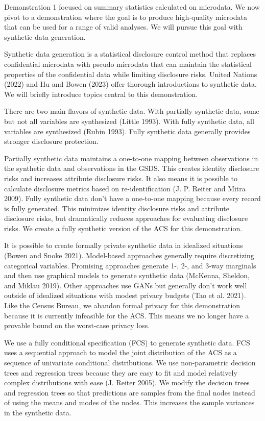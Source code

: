 \documentclass[
]{urban-formatting}
\begin{document}
Demonstration 1 focused on summary statistics calculated on microdata.
We now pivot to a demonstration where the goal is to produce
high-quality microdata that can be used for a range of valid analyses.
We will pursue this goal with synthetic data generation.

Synthetic data generation is a statistical disclosure control method
that replaces confidential microdata with pseudo microdata that can
maintain the statistical properties of the confidential data while
limiting disclosure risks. United Nations (2022) and Hu and Bowen (2023)
offer thorough introductions to synthetic data. We will briefly
introduce topics central to this demonstration.

There are two main flavors of synthetic data. With partially synthetic
data, some but not all variables are synthesized (Little 1993). With
fully synthetic data, all variables are synthesized (Rubin 1993). Fully
synthetic data generally provides stronger disclosure protection.

Partially synthetic data maintains a one-to-one mapping between
observations in the synthetic data and observations in the GSDS. This
creates identity disclosure risks and increases attribute disclosure
risks. It also means it is possible to calculate disclosure metrics
based on re-identification (J. P. Reiter and Mitra 2009). Fully
synthetic data don't have a one-to-one mapping because every record is
fully generated. This minimizes identity disclosure risks and attribute
disclosure risks, but dramatically reduces approaches for evaluating
disclosure risks. We create a fully synthetic version of the ACS for
this demonstration.

It is possible to create formally private synthetic data in idealized
situations (Bowen and Snoke 2021). Model-based approaches generally
require discretizing categorical variables. Promising approaches
generate 1-, 2-, and 3-way marginals and then use graphical models to
generate synthetic data (McKenna, Sheldon, and Miklau 2019). Other
approaches use GANs but generally don't work well outside of idealized
situations with modest privacy budgets (Tao et al. 2021). Like the
Census Bureau, we abandon formal privacy for this demonstration because
it is currently infeasible for the ACS. This means we no longer have a
provable bound on the worst-case privacy loss.

We use a fully conditional specification (FCS) to generate synthetic
data. FCS uses a sequential approach to model the joint distribution of
the ACS as a sequence of univariate conditional distributions. We use
non-parametric decision trees and regression trees because they are easy
to fit and model relatively complex distributions with ease (J. Reiter
2005). We modify the decision trees and regression trees so that
predictions are samples from the final nodes instead of using the means
and modes of the nodes. This increases the sample variances in the
synthetic data.
\end{document}
